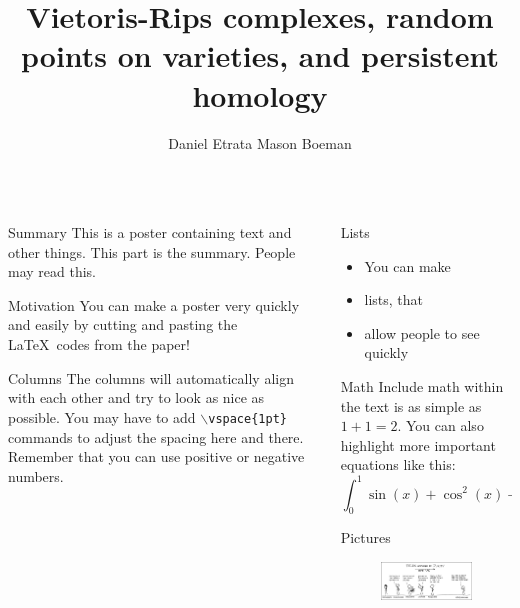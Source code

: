 \documentclass{beamer}
\title{Vietoris-Rips complexes, random points on varieties, and persistent homology}
\author{Daniel Etrata \quad Mason Boeman}
\institute{Benjamin Antieau and J\={a}nis Lazovskis}
\begin{document}
\begin{frame}{}
\begin{columns}[t]

\begin{column}{0.32\linewidth}

\begin{block}{Summary}
This is a poster containing text and other things. This part is the summary. People may read this.
\end{block}

\begin{block}{Motivation}
You can make a poster very quickly and easily by cutting and pasting the \LaTeX\ codes from the paper!
\end{block}

\begin{block}{Columns}
The columns will automatically align with each other and try to look as nice as possible.
You may have to add {\tt$\backslash$vspace\{1pt\}} commands to adjust the spacing here and
there.  Remember that you can use positive or negative numbers.
\end{block}

\end{column}%

\begin{column}{0.32\linewidth}

\begin{block}{Lists}
\begin{itemize}
\item You can make
\item lists, that
\item allow people to see quickly
\end{itemize}
\end{block}

\begin{block}{Math}
Include math within the text is as simple as $1+1=2$. You can also highlight more important equations like this:
\[
\int_0^1\sin(x)+\cos^2(x)+\alpha x\ dx
\]
\end{block}

\begin{block}{Pictures}
\begin{figure}[htb]
\centering
\includegraphics[width=.6\columnwidth]{science}
\end{figure}
\end{block}


\end{column}
\end{columns}
\end{frame}
\end{document}
